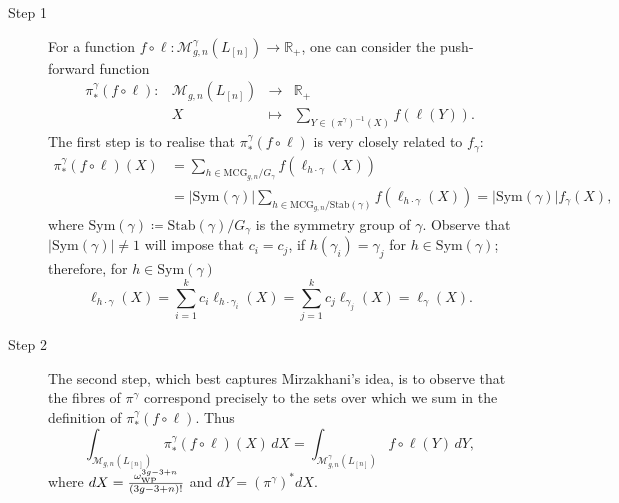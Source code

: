 \documentclass[12pt]{amsart}
\theoremstyle{plain}
\theoremstyle{definition}
\theoremstyle{remark}
\numberwithin{equation}{section}
\begin{document}
\begin{description}
\item[{\rm Step 1}]  \label{item:Step1} For a function $f\circ \ell\colon \mathcal{M}_{g,n}^{\gamma}(L_{[n]})\rightarrow \mathbb{R}_+$, one can consider the push-forward function 
$$
\begin{array}{lrcl}
\pi_*^{\gamma}(f\circ\ell) \colon &  \mathcal{M}_{g,n}(L_{[n]})&\longrightarrow  & \mathbb{R}_+\\
& X & \mapsto & \sum_{Y\in(\pi^{\gamma})^{-1}(X)} f(\ell(Y)).
\end{array}
$$
The first step is to realise that $\pi_*^{\gamma}(f\circ\ell)$ is very closely related to $f_{\gamma}$:
\begin{align*}
\pi_*^{\gamma}(f\circ\ell)(X) & =\sum_{h\in \mathrm{MCG}_{g,n}/G_{\gamma}} f(\ell_{h\cdot\gamma}(X)) \nonumber \\
&=\left|\mathrm{Sym}(\gamma)\right|\sum_{h\in\mathrm{MCG}_{g,n}/\mathrm{Stab}(\gamma)}f(\ell_{h\cdot\gamma}(X))=\left|\mathrm{Sym}(\gamma)\right| f_{\gamma}(X),
\end{align*}
where $\mathrm{Sym}(\gamma)\coloneqq \mathrm{Stab}(\gamma)/G_{\gamma}$ is the symmetry group of $\gamma$. Observe that $\left|\mathrm{Sym}(\gamma)\right|\neq 1$ will impose that $c_i=c_j$, if $h(\gamma_i)=\gamma_j$ for $h\in\mathrm{Sym}(\gamma)$; therefore, for $h\in\mathrm{Sym}(\gamma)$
$$
\ell_{h\cdot\gamma}(X)=\sum_{i=1}^kc_i\ell_{h\cdot\gamma_i}(X)=\sum_{j=1}^kc_j\ell_{\gamma_j}(X)=\ell_{\gamma}(X).
$$

\item[{\rm Step 2}]  \label{item:Step2} The second step, which best captures Mirzakhani's idea, is to observe that the fibres of $\pi^{\gamma}$ correspond precisely to the sets over which we sum in the definition of $\pi_*^{\gamma}(f\circ\ell)$. Thus
\begin{equation*}
\int_{\mathcal{M}_{g,n}(L_{[n]})}\pi_*^{\gamma}(f\circ\ell)(X)\,dX=\int_{\mathcal{M}_{g,n}^{\gamma}(L_{[n]})} f\circ\ell(Y)\,dY,
\end{equation*}
where $dX=\frac{\omega_{{\rm WP}}^{3g-3+n}}{(3g-3+n)!}$ and $dY=(\pi^{\gamma})^*dX$.


\end{description}
\end{document}

